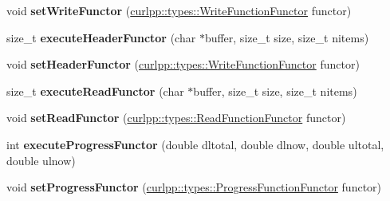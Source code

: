 \begin{DoxyCompactItemize}
\item 
\hypertarget{classcurlpp_1_1internal_1_1CurlHandle_a848df273cfbb8cae7413a0e160707f37}{void {\bfseries set\-Write\-Functor} (\hyperlink{classutilspp_1_1Functor}{curlpp\-::types\-::\-Write\-Function\-Functor} functor)}\label{classcurlpp_1_1internal_1_1CurlHandle_a848df273cfbb8cae7413a0e160707f37}

\item 
\hypertarget{classcurlpp_1_1internal_1_1CurlHandle_ac7662650f40ad7fdb6fc8e95ff979fa9}{size\-\_\-t {\bfseries execute\-Header\-Functor} (char $\ast$buffer, size\-\_\-t size, size\-\_\-t nitems)}\label{classcurlpp_1_1internal_1_1CurlHandle_ac7662650f40ad7fdb6fc8e95ff979fa9}

\item 
\hypertarget{classcurlpp_1_1internal_1_1CurlHandle_a585ae1e9991534e48d073f56361ec5ff}{void {\bfseries set\-Header\-Functor} (\hyperlink{classutilspp_1_1Functor}{curlpp\-::types\-::\-Write\-Function\-Functor} functor)}\label{classcurlpp_1_1internal_1_1CurlHandle_a585ae1e9991534e48d073f56361ec5ff}

\item 
\hypertarget{classcurlpp_1_1internal_1_1CurlHandle_a34a51c2a15f08b9643025801184738eb}{size\-\_\-t {\bfseries execute\-Read\-Functor} (char $\ast$buffer, size\-\_\-t size, size\-\_\-t nitems)}\label{classcurlpp_1_1internal_1_1CurlHandle_a34a51c2a15f08b9643025801184738eb}

\item 
\hypertarget{classcurlpp_1_1internal_1_1CurlHandle_ae116674f2a89956247d5cf85737d47de}{void {\bfseries set\-Read\-Functor} (\hyperlink{classutilspp_1_1Functor}{curlpp\-::types\-::\-Read\-Function\-Functor} functor)}\label{classcurlpp_1_1internal_1_1CurlHandle_ae116674f2a89956247d5cf85737d47de}

\item 
\hypertarget{classcurlpp_1_1internal_1_1CurlHandle_a86621767b2fbb1343ceac9dbe3b2a07b}{int {\bfseries execute\-Progress\-Functor} (double dltotal, double dlnow, double ultotal, double ulnow)}\label{classcurlpp_1_1internal_1_1CurlHandle_a86621767b2fbb1343ceac9dbe3b2a07b}

\item 
\hypertarget{classcurlpp_1_1internal_1_1CurlHandle_abda84c7e8f6e1d92de16027f2e30fdcd}{void {\bfseries set\-Progress\-Functor} (\hyperlink{classutilspp_1_1Functor}{curlpp\-::types\-::\-Progress\-Function\-Functor} functor)}\label{classcurlpp_1_1internal_1_1CurlHandle_abda84c7e8f6e1d92de16027f2e30fdcd}


\end{DoxyCompactItemize}
